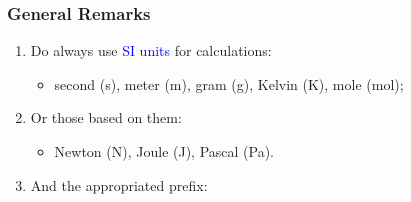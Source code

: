 \documentclass[10pt,compress,handout,ignorenonframetext]{beamer}
\begin{document}
\begin{frame}
 \frametitle{General Remarks}
  \begin{enumerate}
   \item <1-> Do always use \textcolor{blue}{SI units} for calculations:
     \begin{itemize}
       \item<1-> second (s), meter (m), gram (g), Kelvin (K), mole (mol);
     \end{itemize}
   \item<2-> Or those based on them:
     \begin{itemize}
       \item<2-> Newton (N), Joule (J), Pascal (Pa).
     \end{itemize}
   \item<3->  And the appropriated prefix:
  \begin{center}
  \end{center}
  \end{enumerate}

\end{frame}
\end{document}
